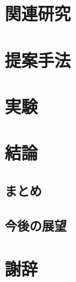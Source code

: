 \documentclass{funthesis}
\begin{document}
\chapter{関連研究}

\chapter{提案手法}

\chapter{実験}

\chapter{結論}
\section{まとめ}
\section{今後の展望}
\chapter *{謝辞}



\begin{thebibliography}{7}
\end{thebibliography}

\listoftables

\listoffigures
\end{document}
